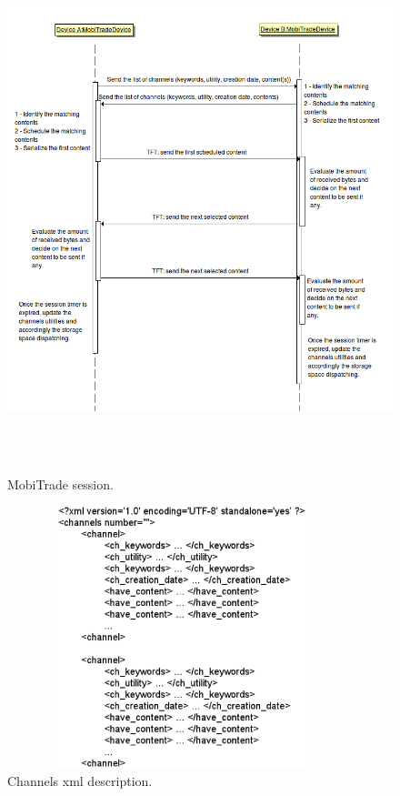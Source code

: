\begin{figure}[!h]
\begin{center}
\includegraphics[width=5in,height=6in]{Chapitre6/MobiTradeSession.png}
\end{center}
\caption{MobiTrade session.}
\label{mobitradesession}
\end{figure}

\begin{figure}[!h]
\begin{center}
\includegraphics[width=4in,height=3in]{Chapitre6/channelsxml.eps}
\end{center}
\caption{Channels xml description.}
\label{channelsxml}
\end{figure}

